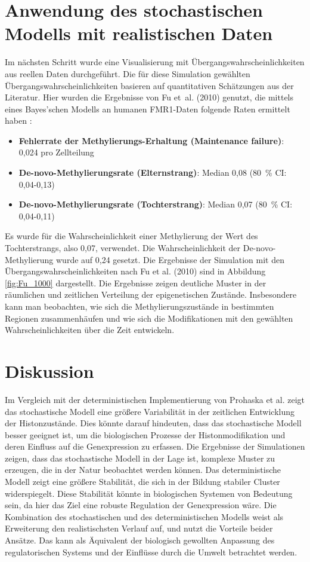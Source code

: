 \documentclass{SeminarV2}
\begin{document}
\section{Anwendung des stochastischen Modells mit realistischen Daten}
Im n\"{a}chsten Schritt wurde eine Visualisierung mit \"{U}bergangswahrscheinlichkeiten aus reellen Daten durchgef\"{u}hrt. Die f\"{u}r diese Simulation gew\"{a}hlten \"{U}bergangswahrscheinlichkeiten basieren auf quantitativen Sch\"{a}tzungen aus der Literatur.  
Hier wurden die Ergebnisse von Fu et al. (2010) genutzt, die mittels eines Bayes'schen Modells an humanen FMR1-Daten folgende Raten ermittelt haben \cite{fu-2010}:
\begin{itemize}
  \item \textbf{Fehlerrate der Methylierungs-Erhaltung (Maintenance failure)}: 0{,}024 pro Zellteilung  
  \item \textbf{De-novo-Methylierungsrate (Elternstrang)}: Median 0{,}08 (80 \% CI: 0,04-0,13)  
  \item \textbf{De-novo-Methylierungsrate (Tochterstrang)}: Median 0{,}07 (80 \% CI: 0,04-0,11)  
\end{itemize}
Es wurde für die Wahrscheinlichkeit einer Methylierung der Wert des Tochterstrangs,
also 0,07, verwendet. Die Wahrscheinlichkeit der De-novo-Methylierung wurde auf 0,24 gesetzt. Die Ergebnisse der Simulation mit den \"{U}bergangswahrscheinlichkeiten nach Fu et al. (2010) sind in Abbildung \ref{fig:Fu_1000} dargestellt.
Die Ergebnisse zeigen deutliche Muster in der r\"{a}umlichen und zeitlichen 
Verteilung der epigenetischen Zust\"{a}nde. Insbesondere kann man beobachten, wie sich die Methylierungszust\"{a}nde in bestimmten Regionen zusammenh\"{a}ufen und wie sich die Modifikationen mit den gewählten Wahrscheinlichkeiten \"{u}ber die Zeit entwickeln.

\section{Diskussion}
Im Vergleich mit der deterministischen Implementierung von Prohaska et al. zeigt das stochastische Modell eine größere Variabilität in der zeitlichen Entwicklung der Histonzustände. Dies könnte darauf hindeuten, dass das stochastische Modell besser geeignet ist, um die biologischen Prozesse der Histonmodifikation und deren Einfluss auf die Genexpression zu erfassen. Die Ergebnisse der Simulationen zeigen, dass das stochastische Modell in der Lage ist, komplexe Muster zu erzeugen, die in der Natur beobachtet werden können.
Das deterministische Modell zeigt eine größere Stabilität, die sich in der Bildung stabiler Cluster widerspiegelt. Diese Stabilität könnte in biologischen Systemen von Bedeutung sein, da hier das Ziel eine robuste Regulation der Genexpression wäre.
Die Kombination des stochastischen und des deterministischen Modells weist als Erweiterung den realistischsten Verlauf auf, und nutzt die Vorteile beider Ansätze. 
Das kann als Äquivalent der biologisch gewollten Anpassung des regulatorischen Systems und der Einflüsse durch die Umwelt betrachtet werden.
\end{document}
